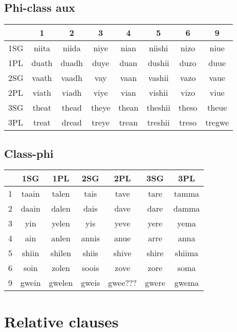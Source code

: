 \documentclass[11pt]{book}
\begin{document}
\subsection{Phi-class aux}
\begin{center}
	\begin{tabular}{|l|c|c|c|c|c|c|c|}
	\hline
	& 1 & 2 & 3 & 4 & 5 & 6 & 9 \\ \hline
    1SG & niita & niida & niye & nian & niishi & nizo & niue  \\ \hline
    1PL & duath & duadh & duye & duan & dushii & duzo & duue \\ \hline 
    2SG & vaath & vaadh & vay & vaan & vashii & vazo & vaue \\ \hline
    2PL & viath & viadh & viye & vian & vishii & vizo & viue \\ \hline
  	3SG & theat & thead & theye & thean & theshii & theso & theue \\ \hline
  	3PL & treat & dread & treye & trean & treshii & treso & tregwe \\ \hline
	\end{tabular}
\end{center}

\subsection{Class-phi}
\begin{center}
	\begin{tabular}{|l|c|c|c|c|c|c|}
	  \hline
      & 1SG & 1PL & 2SG & 2PL & 3SG & 3PL \\ \hline
      1 & taain & talen & tais & tave & tare & tamma  \\ \hline
      2 & daain & dalen & dais & dave & dare & damma \\ \hline
      3 & yin  & yelen & yis & yeve & yere & yema \\ \hline
      4 & ain & anlen & annis & anue & arre & anna \\ \hline
      5 & shiin & shilen & shiis & shive & shire  & shiima\\ \hline
      6 & soin & zolen & soois & zove & zore & soma \\ \hline
      9 & gwein & gwelen & gweis & gwee??? & gwere & gwema\\ \hline
      \end{tabular}
\end{center}

\section{Relative clauses}
\end{document}
